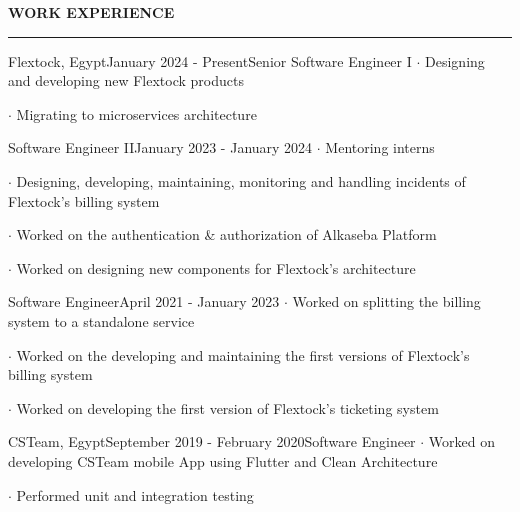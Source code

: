 \noindent\textcolor{themecolor}{\textbf{WORK EXPERIENCE}}

\vspace{2mm}
\hrule
\vspace{3mm}

\begin{verbose}{Flextock, Egypt}{January 2024 - Present}{Senior Software Engineer I}
    \noindent $\cdot$ Designing and developing new Flextock products

    \noindent $\cdot$ Migrating to microservices architecture
\end{verbose}

\vspace{2mm}

\begin{verboselevel2}{Software Engineer II}{January 2023 - January 2024}
    \noindent $\cdot$ Mentoring interns

    \noindent $\cdot$ Designing, developing, maintaining, monitoring and handling incidents of Flextock's billing system

    \noindent $\cdot$ Worked on the authentication \& authorization of Alkaseba Platform

    \noindent $\cdot$ Worked on designing new components for Flextock's architecture
\end{verboselevel2}

\vspace{2mm}

\begin{verboselevel2}{Software Engineer}{April 2021 - January 2023}
    \noindent $\cdot$ Worked on splitting the billing system to a standalone service

    \noindent $\cdot$ Worked on the developing and maintaining the first versions of Flextock's billing system

    \noindent $\cdot$ Worked on developing the first version of Flextock's ticketing system
\end{verboselevel2}

\vspace{3mm}

\begin{verbose}{CSTeam, Egypt}{September 2019 - February 2020}{Software Engineer}
    \noindent $\cdot$ Worked on developing CSTeam mobile App using Flutter and Clean Architecture

    \noindent $\cdot$ Performed unit and integration testing
\end{verbose}

\vspace{3mm}

